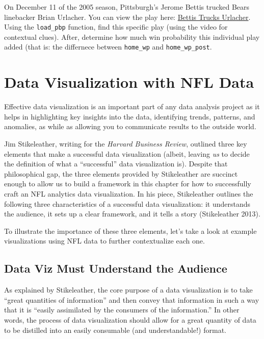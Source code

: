 \documentclass[
  letterpaper,
]{krantz}
\begin{document}
On December 11 of the 2005 season, Pittsburgh's Jerome Bettis trucked
Bears linebacker Brian Urlacher. You can view the play here:
\href{https://www.youtube.com/watch?v=u0mtG-8DWYk}{Bettis Trucks
Urlacher}. Using the \texttt{load\_pbp} function, find this specific
play (using the video for contextual clues). After, determine how much
win probability this individual play added (that is: the differnece
between \texttt{home\_wp} and \texttt{home\_wp\_post}.


\hypertarget{data-visualization-with-nfl-data}{%
\chapter{Data Visualization with NFL
Data}\label{data-visualization-with-nfl-data}}

Effective data visualization is an important part of any data analysis
project as it helps in highlighting key insights into the data,
identifying trends, patterns, and anomalies, as while as allowing you to
communicate results to the outside world.

Jim Stikeleather, writing for the \emph{Harvard Business Review},
outlined three key elements that make a successful data visualization
(albeit, leaving \emph{us} to decide the definition of what a
``successful'' data visualization is). Despite that philosophical gap,
the three elements provided by Stikeleather are succinct enough to allow
us to build a framework in this chapter for how to successfully craft an
NFL analytics data visualization. In his piece, Stikeleather outlines
the following three characteristics of a successful data visualization:
it understands the audience, it sets up a clear framework, and it tells
a story (Stikeleather 2013).

To illustrate the importance of these three elements, let's take a look
at example visualizations using NFL data to further contextualize each
one.

\hypertarget{data-viz-must-understand-the-audience}{%
\section{Data Viz Must Understand the
Audience}\label{data-viz-must-understand-the-audience}}

As explained by Stikeleather, the core purpose of a data visualization
is to take ``great quantities of information'' and then convey that
information in such a way that it is ``easily assimilated by the
consumers of the information.'' In other words, the process of data
visualization should allow for a great quantity of data to be distilled
into an easily consumable (and understandable!) format.
\end{document}
